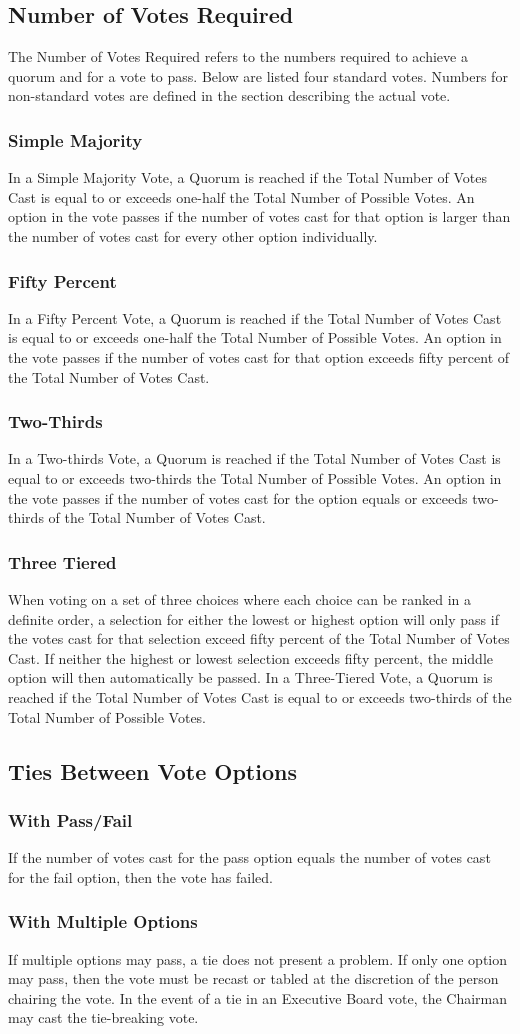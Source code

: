 \documentclass{article}
\newcommand{\asection}[1]{\subsection{#1} \label{#1}}
\newcommand{\asubsection}[1]{\subsubsection{#1} \label{#1}}
\begin{document}
\asection{Number of Votes Required}
The Number of Votes Required refers to the numbers required to achieve a quorum and for a vote to pass. Below are listed four standard votes. Numbers for non-standard votes are defined in the section describing the actual vote.
\asubsection{Simple Majority}
In a Simple Majority Vote, a Quorum is reached if the Total Number of Votes Cast is equal to or exceeds one-half the Total Number of Possible Votes. An option in the vote passes if the number of votes cast for that option is larger than the number of votes cast for every other option individually.
\asubsection{Fifty Percent}
In a Fifty Percent Vote, a Quorum is reached if the Total Number of Votes Cast is equal to or exceeds one-half the Total Number of Possible Votes. An option in the vote passes if the number of votes cast for that option exceeds fifty percent of the Total Number of Votes Cast.
\asubsection{Two-Thirds}
In a Two-thirds Vote, a Quorum is reached if the Total Number of Votes Cast is equal to or exceeds two-thirds the Total Number of Possible Votes. An option in the vote passes if the number of votes cast for the option equals or exceeds two-thirds of the Total Number of Votes Cast.
\asubsection{Three Tiered}
When voting on a set of three choices where each choice can be ranked in a definite order, a selection for either the lowest or highest option will only pass if the votes cast for that selection exceed fifty percent of the Total Number of Votes Cast. If neither the highest or lowest selection exceeds fifty percent, the middle option will then automatically be passed. In a Three-Tiered Vote, a Quorum is reached if the Total Number of Votes Cast is equal to or exceeds two-thirds of the Total Number of Possible Votes.

\asection{Ties Between Vote Options}
\asubsection{With Pass/Fail}
If the number of votes cast for the pass option equals the number of votes cast for the fail option, then the vote has failed.
\asubsection{With Multiple Options}
If multiple options may pass, a tie does not present a problem. If only one option may pass, then the vote must be recast or tabled at the discretion of the person chairing the vote. In the event of a tie in an Executive Board vote, the Chairman may cast the tie-breaking vote.
\end{document}
